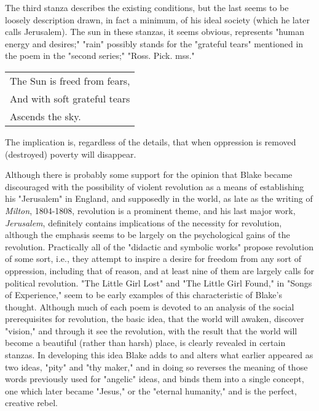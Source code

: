 The third stanza describes the existing conditions, but the last seems to be loosely description drawn, in fact
a minimum, of his ideal society (which he later calls Jerusalem). The sun in these stanzas, it seems obvious, represents
"human energy and desires;" "rain" possibly stands for the "grateful tears" mentioned in the poem in the "second series;"
"Ross. Pick. mss."\par
\begin{center}
	\begin{tabular}{l}
		The Sun is freed from fears, \\
		And with soft grateful tears \\
		Ascends the sky.
	\end{tabular}
\end{center}
\hspace*{5mm}The implication is, regardless of the details, that when oppression
is removed (destroyed) poverty will disappear.\par
\vspace*{0.5\baselineskip}
Although there is probably some support for the opinion that Blake became discouraged with the
possibility of violent revolution as a means of establishing his "Jerusalem" in England, and supposedly
in the world, as late as the writing of \textit{Milton}, 1804-1808, revolution is a prominent theme, and his
last major work, \textit{Jerusalem}, definitely contains implications of the necessity for revolution,
although the emphasis seems to be largely on the psychological gains of the revolution. Practically all of
the "didactic and symbolic works" propose revolution of some sort, i.e., they attempt to inspire a desire
for freedom from any sort of oppression, including that of reason, and at least nine of them are largely
calls for political revolution. "The Little Girl Lost" and "The Little Girl Found," in "Songs of Experience," seem
to be early examples of this characteristic of Blake's thought. Although much of each poem is devoted to an analysis
of the social prerequisites for revolution, the basic idea, that the world will awaken, discover "vision," and
through it see the revolution, with the result that the world will become a beautiful (rather than harsh) place,
is clearly revealed in certain stanzas. In developing this idea Blake adds to and alters what earlier
appeared as two ideas, "pity" and "thy maker," and in doing so reverses the meaning of those words previously
used for "angelic" ideas, and binds them into a single concept, one which later became "Jesus," or the
"eternal humanity," and is the perfect, creative rebel.\par

